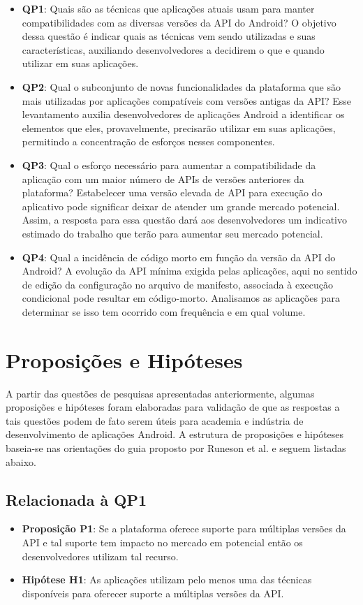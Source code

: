 \begin{itemize}
	\item \textbf{QP1}: Quais são as técnicas que aplicações atuais usam para manter
	compatibilidades com as diversas versões da API do Android? O objetivo dessa questão
	é indicar quais as técnicas vem sendo utilizadas e suas características, auxiliando
	desenvolvedores a decidirem o que e quando utilizar em suas aplicações.
	\item \textbf{QP2}: Qual o subconjunto de novas funcionalidades da plataforma que são
	mais utilizadas por aplicações compatíveis com versões antigas da API? Esse levantamento
	auxilia desenvolvedores de aplicações Android a identificar os elementos que eles, provavelmente,
	precisarão utilizar em suas aplicações, permitindo a concentração de esforços nesses componentes.
	\item \textbf{QP3}: Qual o esforço necessário para aumentar a compatibilidade da aplicação 
	com um maior número de APIs de versões anteriores da plataforma? Estabelecer uma versão
	elevada de API para execução do aplicativo pode significar deixar de atender um grande
	mercado potencial. Assim, a resposta para essa questão dará aos desenvolvedores um
	indicativo estimado do trabalho que terão para aumentar seu mercado potencial.
	\item \textbf{QP4}: Qual a incidência de código morto em função da versão da API do Android? 
	A evolução da API mínima exigida pelas aplicações, aqui no sentido de edição da configuração
	no arquivo de manifesto, associada à execução condicional pode resultar em código-morto.
	Analisamos as aplicações para determinar se isso tem ocorrido com frequência e em qual volume.
\end{itemize}

\section{Proposições e Hipóteses} \label{sec:hipoteses}

A partir das questões de pesquisas apresentadas anteriormente, algumas proposições
e hipóteses foram elaboradas para validação de que as respostas a tais questões podem
de fato serem úteis para academia e indústria de desenvolvimento de aplicações Android.
A estrutura de proposições e hipóteses baseia-se nas orientações do guia proposto por 
Runeson et al. \cite{Runeson2012} e seguem listadas abaixo.

\subsection{Relacionada à QP1}
	\begin{itemize}
		\item \textbf{Proposição P1}: Se a plataforma oferece suporte para múltiplas versões
		da API e tal suporte tem impacto no mercado em potencial então os desenvolvedores
		utilizam tal recurso.
		\item \textbf{Hipótese H1}: As aplicações utilizam pelo menos uma das técnicas disponíveis
		para oferecer suporte a múltiplas versões da API.
	\end{itemize}

